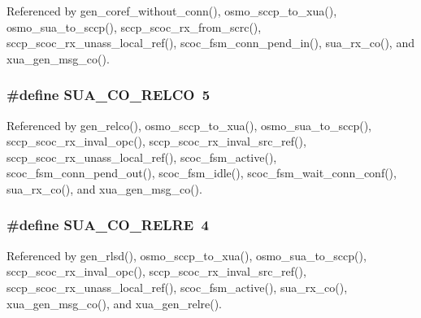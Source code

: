 Referenced by gen\+\_\+coref\+\_\+without\+\_\+conn(), osmo\+\_\+sccp\+\_\+to\+\_\+xua(), osmo\+\_\+sua\+\_\+to\+\_\+sccp(), sccp\+\_\+scoc\+\_\+rx\+\_\+from\+\_\+scrc(), sccp\+\_\+scoc\+\_\+rx\+\_\+unass\+\_\+local\+\_\+ref(), scoc\+\_\+fsm\+\_\+conn\+\_\+pend\+\_\+in(), sua\+\_\+rx\+\_\+co(), and xua\+\_\+gen\+\_\+msg\+\_\+co().

\subsubsection[{S\+U\+A\+\_\+\+C\+O\+\_\+\+R\+E\+L\+CO}]{\setlength{\rightskip}{0pt plus 5cm}\#define S\+U\+A\+\_\+\+C\+O\+\_\+\+R\+E\+L\+CO~5}\label{sua_8h_a7c19ca66d01a97dbcb9af77036abe920}


Referenced by gen\+\_\+relco(), osmo\+\_\+sccp\+\_\+to\+\_\+xua(), osmo\+\_\+sua\+\_\+to\+\_\+sccp(), sccp\+\_\+scoc\+\_\+rx\+\_\+inval\+\_\+opc(), sccp\+\_\+scoc\+\_\+rx\+\_\+inval\+\_\+src\+\_\+ref(), sccp\+\_\+scoc\+\_\+rx\+\_\+unass\+\_\+local\+\_\+ref(), scoc\+\_\+fsm\+\_\+active(), scoc\+\_\+fsm\+\_\+conn\+\_\+pend\+\_\+out(), scoc\+\_\+fsm\+\_\+idle(), scoc\+\_\+fsm\+\_\+wait\+\_\+conn\+\_\+conf(), sua\+\_\+rx\+\_\+co(), and xua\+\_\+gen\+\_\+msg\+\_\+co().

\subsubsection[{S\+U\+A\+\_\+\+C\+O\+\_\+\+R\+E\+L\+RE}]{\setlength{\rightskip}{0pt plus 5cm}\#define S\+U\+A\+\_\+\+C\+O\+\_\+\+R\+E\+L\+RE~4}\label{sua_8h_af18e5c15c5f9ded72d4b5d385a42799c}


Referenced by gen\+\_\+rlsd(), osmo\+\_\+sccp\+\_\+to\+\_\+xua(), osmo\+\_\+sua\+\_\+to\+\_\+sccp(), sccp\+\_\+scoc\+\_\+rx\+\_\+inval\+\_\+opc(), sccp\+\_\+scoc\+\_\+rx\+\_\+inval\+\_\+src\+\_\+ref(), sccp\+\_\+scoc\+\_\+rx\+\_\+unass\+\_\+local\+\_\+ref(), scoc\+\_\+fsm\+\_\+active(), sua\+\_\+rx\+\_\+co(), xua\+\_\+gen\+\_\+msg\+\_\+co(), and xua\+\_\+gen\+\_\+relre().

